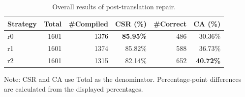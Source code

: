 \begin{table}[t]
\centering
\caption{Overall results of post-translation repair.}
\label{tab:repair_overall}
\begin{tabular}{lrrrrr}
\toprule
Strategy & Total & \#Compiled & CSR (\%) & \#Correct & CA (\%) \\
\midrule
r0 & 1601 & 1376 & \textbf{85.95\%} & 486 & 30.36\% \\
r1 & 1601 & 1374 & 85.82\% & 588 & 36.73\% \\
r2 & 1601 & 1315 & 82.14\% & 652 & \textbf{40.72\%} \\
\bottomrule
\end{tabular}
\par\smallskip
\begin{minipage}{0.95\linewidth}
\footnotesize
Note: CSR and CA use Total as the denominator. Percentage-point differences are calculated from the displayed percentages.
\end{minipage}
\end{table}
